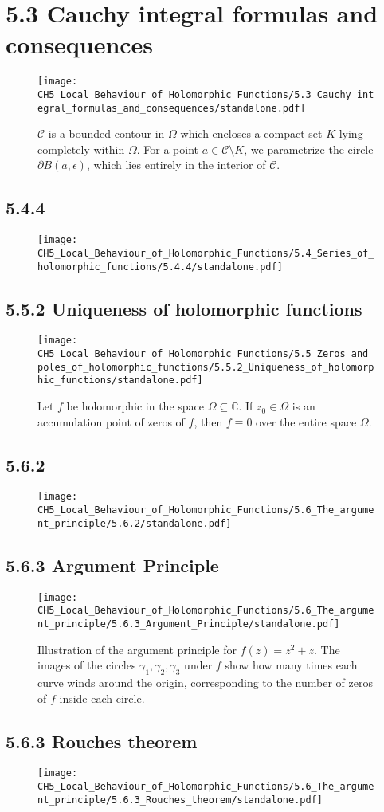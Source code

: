 \documentclass{book}
\begin{document}
\section*{5.3 Cauchy integral formulas and consequences}
\begin{figure}[H]
\centering
\texttt{[image: CH5\_Local\_Behaviour\_of\_Holomorphic\_Functions/5.3\_Cauchy\_integral\_formulas\_and\_consequences/standalone.pdf]}
\caption{$\mathcal{C}$ is a bounded contour in $\Omega$ which encloses a compact set $K$ lying completely within $\Omega$. For a point $a \in \mathcal{C} \setminus K$, we parametrize the circle $\partial B(a, \epsilon)$, which lies entirely in the interior of $\mathcal{C}$.}
\end{figure}

\subsection*{5.4.4}
\begin{figure}[H]
\centering
\texttt{[image: CH5\_Local\_Behaviour\_of\_Holomorphic\_Functions/5.4\_Series\_of\_holomorphic\_functions/5.4.4/standalone.pdf]}
\caption{}
\end{figure}

\subsection*{5.5.2 Uniqueness of holomorphic functions}
\begin{figure}[H]
\centering
\texttt{[image: CH5\_Local\_Behaviour\_of\_Holomorphic\_Functions/5.5\_Zeros\_and\_poles\_of\_holomorphic\_functions/5.5.2\_Uniqueness\_of\_holomorphic\_functions/standalone.pdf]}
\caption{Let $f$ be holomorphic in the space $\Omega \subseteq \mathbb{C}$. If $z_0 \in \Omega$ is an accumulation point of zeros of $f$, then $f\equiv 0$ over the entire space $\Omega$. }
\end{figure}

\subsection*{5.6.2}
\begin{figure}[H]
\centering
\texttt{[image: CH5\_Local\_Behaviour\_of\_Holomorphic\_Functions/5.6\_The\_argument\_principle/5.6.2/standalone.pdf]}
\caption{}
\end{figure}

\subsection*{5.6.3 Argument Principle}
\begin{figure}[H]
\centering
\texttt{[image: CH5\_Local\_Behaviour\_of\_Holomorphic\_Functions/5.6\_The\_argument\_principle/5.6.3\_Argument\_Principle/standalone.pdf]}
\caption{Illustration of the argument principle for $ f(z) = z^2 + z $. The images of the circles $ \gamma_1, \gamma_2, \gamma_3 $ under $ f $ show how many times each curve winds around the origin, corresponding to the number of zeros of $ f $ inside each circle.}
\end{figure}

\subsection*{5.6.3 Rouches theorem}
\begin{figure}[H]
\centering
\texttt{[image: CH5\_Local\_Behaviour\_of\_Holomorphic\_Functions/5.6\_The\_argument\_principle/5.6.3\_Rouches\_theorem/standalone.pdf]}
\caption{}
\end{figure}
\end{document}
